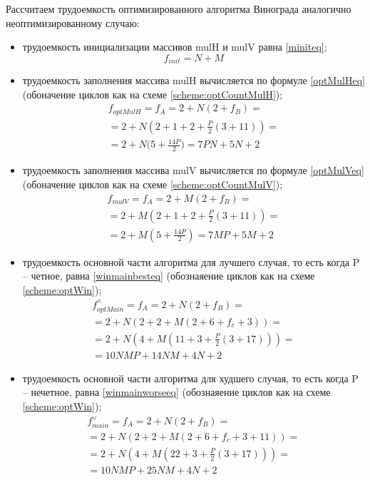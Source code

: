 Рассчитаем трудоемкость оптимизированного алгоритма Винограда аналогично
неоптимизированному случаю:
\begin{itemize}[left=\parindent]
    \item трудоемкость инициализации массивов mulH и mulV равна \ref{miniteq};
        \begin{equation}\label{miniteq}
            f_{init} = N + M
        \end{equation}

    \item трудоемкость заполнения массива mulH вычисляется по формуле
        \ref{optMulHeq} (обоначение циклов как на схеме
        \ref{scheme:optCountMulH});
        \begin{multline}\label{optMulHeq}
            f_{optMulH} = f_A = 2 + N(2 + f_B) = \\ = 2 + N(2 +
                       1 + 2 + \frac{P}{2}(3 + 11)) = \\ = 2 +
                       N\big(5 + \frac{14P}{2}\big) = 7PN + 5N + 2
        \end{multline}

    \item трудоемкость заполнения массива mulV вычисляется по формуле
        \ref{optMulVeq} (обоначение циклов как на схеме
        \ref{scheme:optCountMulV});
        \begin{multline}\label{optMulVeq}
            f_{mulV} = f_A = 2 + M(2 + f_B) = \\ = 2 +
            M(2 + 1 + 2 + \frac{P}{2}(3 + 11)) = \\ = 2 + M(5 +
            \frac{14P}{2}) = 7MP + 5M + 2
        \end{multline}

    \item трудоемкость основной части алгоритма для лучшего случая, то есть
        когда P -- четное, равна \ref{winmainbesteq} (обознаяение циклов как на
        схеме \ref{scheme:optWin});
        \begin{multline}\label{winmainbesteq}
            f_{optMain}^{\wedge} = f_A = 2 + N(2 + f_B) = \\ =  2 + N(2 + 2 +
            M(2 + 6 + f_c + 3)) = \\ = 2 + N(4 + M(11 + 3 + \frac{P}{2}(3 +
            17))) = \\ = 10NMP + 14NM + 4N + 2
        \end{multline}

    \item трудоемкость основной части алгоритма для худшего случая, то есть
        когда P -- нечетное, равна \ref{winmainworseeq} (обознаяение циклов как
        на схеме \ref{scheme:optWin});
        \begin{multline}\label{winmainworseeq}
            f_{main}^{\vee} = f_A = 2 + N(2 + f_B) = \\ =  2 + N(2 + 2 + M(2 +
            6 + f_c + 3 + 11)) = \\ = 2 + N(4 + M(22 + 3 + \frac{P}{2}(3 +
            17))) = \\ = 10NMP + 25NM + 4N + 2
        \end{multline}
\end{itemize}

